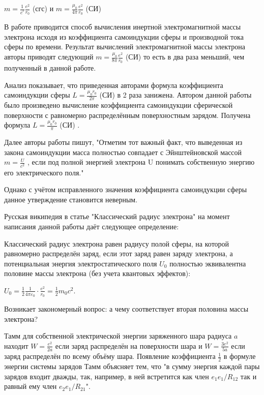 \documentclass{article}
\begin{document}
$m =\frac{1}{{{c}^{^{2}}}}\frac{e^2}{{{r}_{0}}}$ (сгс) и
$m =\frac{{{\mu }_{0}}}{4\pi }\frac{e^2}{{{r}_{0}}}$ (СИ)

В работе \cite{misyuchenko} приводится способ вычисления инертной электромагнитной массы электрона исходя из коэффициента самоиндукции сферы и производной тока сферы по времени. Результат вычислений электромагнитной массы электрона авторы приводят следующий $m =\frac{{{\mu }_{0}}}{8\pi }\frac{e^2}{{{r}_{0}}}$ (СИ) то есть в два раза меньший, чем полученный в данной работе.

Анализ показывает, что приведенная авторами формула коэффициента самоиндукции сферы $L =\frac{{{\mu }_{0}}{r}_{0}}{2\pi }$ (СИ) в 2 раза занижена. Автором данной работы было произведено вычисление коэффициента самоиндукции сферической поверхности с равномерно распределённым поверхностным зарядом. Получена формула $L =\frac{{{\mu }_{0}}{r}_{0}}{\pi }$ (СИ) .

Далее авторы  работы \cite{misyuchenko} пишут, "Отметим тот важный факт, что выведенная из закона самоиндукции масса полностью совпадает с Эйнштейновской массой $m=\frac{U}{c^2}$ , если под полной энергией электрона U понимать собственную энергию его электрического поля."

Однако с учётом исправленного значения коэффициента самоиндукции сферы данное утверждение становится неверным. 

Русская википедия в статье "Классический радиус электрона"  на момент написания данной работы даёт следующее определение:

Классический радиус электрона равен радиусу полой сферы, на которой равномерно распределён заряд, если этот заряд равен заряду электрона, а потенциальная энергия электростатического поля ${U}_{0}$  полностью эквивалентна половине массы электрона (без учета квантовых эффектов):

${\displaystyle U_{0}={\frac {1}{2}}{\frac {1}{4\pi \varepsilon _{0}}}\cdot {\frac {e^{2}}{r_{0}}}={\frac {1}{2}}m_{0}c^{2}}$.

Возникает закономерный вопрос: а чему соответствует вторая половина массы электрона?

Тамм \cite{tamm} для собственной электрической энергии заряженного шара радиуса $a$ находит $W=\frac{e^2}{2a}$ если заряд распределён на поверхности шара и $W=\frac{3e^2}{5a}$ если заряд распределён по всему объёму шара. Появление коэффициента $\frac{1}{2}$  в формуле энергии системы зарядов Тамм объясняет тем, что "в сумму энергия каждой пары зарядов входит дважды, так, например, в ней встретится как член ${e_{1}}{e_{1}}/{R_{12}}$ так и равный ему член ${e_{2}}{e_{1}}/{R_{21}}$".
\end{document}
